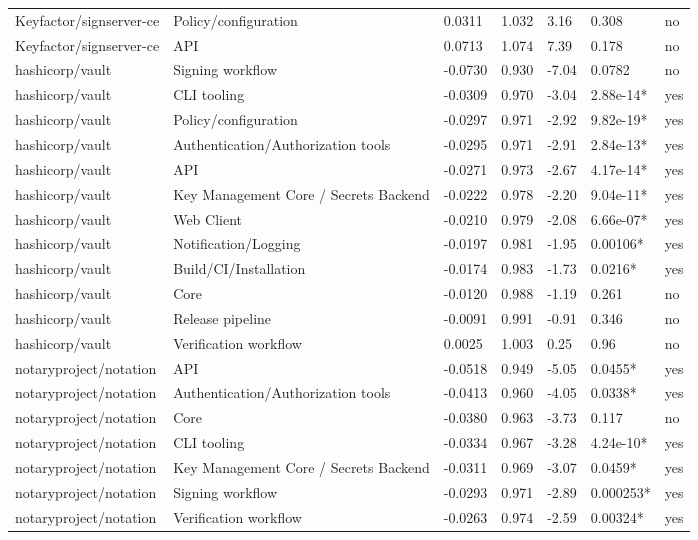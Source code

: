 \begin{table}[t]
\begin{tabular}{lllllll}
Keyfactor/signserver-ce & Policy/configuration & 0.0311 & 1.032 & 3.16 & 0.308 & no \\
Keyfactor/signserver-ce & API & 0.0713 & 1.074 & 7.39 & 0.178 & no \\
hashicorp/vault & Signing workflow & -0.0730 & 0.930 & -7.04 & 0.0782 & no \\
hashicorp/vault & CLI tooling & -0.0309 & 0.970 & -3.04 & 2.88e-14* & yes \\
hashicorp/vault & Policy/configuration & -0.0297 & 0.971 & -2.92 & 9.82e-19* & yes \\
hashicorp/vault & Authentication/Authorization tools & -0.0295 & 0.971 & -2.91 & 2.84e-13* & yes \\
hashicorp/vault & API & -0.0271 & 0.973 & -2.67 & 4.17e-14* & yes \\
hashicorp/vault & Key Management Core / Secrets Backend & -0.0222 & 0.978 & -2.20 & 9.04e-11* & yes \\
hashicorp/vault & Web Client & -0.0210 & 0.979 & -2.08 & 6.66e-07* & yes \\
hashicorp/vault & Notification/Logging & -0.0197 & 0.981 & -1.95 & 0.00106* & yes \\
hashicorp/vault & Build/CI/Installation & -0.0174 & 0.983 & -1.73 & 0.0216* & yes \\
hashicorp/vault & Core & -0.0120 & 0.988 & -1.19 & 0.261 & no \\
hashicorp/vault & Release pipeline & -0.0091 & 0.991 & -0.91 & 0.346 & no \\
hashicorp/vault & Verification workflow & 0.0025 & 1.003 & 0.25 & 0.96 & no \\
notaryproject/notation & API & -0.0518 & 0.949 & -5.05 & 0.0455* & yes \\
notaryproject/notation & Authentication/Authorization tools & -0.0413 & 0.960 & -4.05 & 0.0338* & yes \\
notaryproject/notation & Core & -0.0380 & 0.963 & -3.73 & 0.117 & no \\
notaryproject/notation & CLI tooling & -0.0334 & 0.967 & -3.28 & 4.24e-10* & yes \\
notaryproject/notation & Key Management Core / Secrets Backend & -0.0311 & 0.969 & -3.07 & 0.0459* & yes \\
notaryproject/notation & Signing workflow & -0.0293 & 0.971 & -2.89 & 0.000253* & yes \\
notaryproject/notation & Verification workflow & -0.0263 & 0.974 & -2.59 & 0.00324* & yes \\

\end{tabular}
\end{table}
